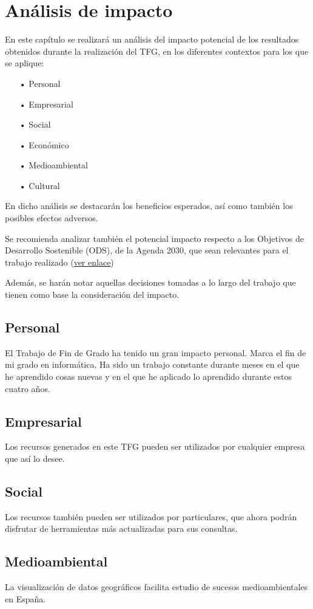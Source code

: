\chapter{Análisis de impacto}
En este capítulo se realizará un análisis del impacto potencial de los resultados obtenidos durante la realización del TFG, en los diferentes contextos para los que se aplique:

\begin{enumerate}
\item[•] Personal
\item[•] Empresarial
\item[•] Social
\item[•] Económico
\item[•] Medioambiental
\item[•] Cultural
\end{enumerate}

En dicho análisis se destacarán los beneficios esperados, así como también los posibles efectos adversos.

Se recomienda analizar también el potencial impacto respecto a los Objetivos de Desarrollo Sostenible (ODS), de la Agenda 2030, que sean relevantes para el trabajo realizado (\href{https://www.un.org/sustainabledevelopment/es/objetivos-de-desarrollo-sostenible/}{ver enlace})

Además, se harán notar aquellas decisiones tomadas a lo largo del trabajo que tienen como base la consideración del impacto.

\section{Personal}
El Trabajo de Fin de Grado ha tenido un gran impacto personal. Marca el fin de mi grado en informática. Ha sido
un trabajo constante durante meses en el que he aprendido cosas nuevas y en el que he aplicado lo aprendido
durante estos cuatro años.

\section{Empresarial}
Los recursos generados en este TFG pueden ser utilizados por cualquier empresa que así lo desee.

\section{Social}
Los recursos también pueden ser utilizados por particulares, que ahora podrán disfrutar de herramientas más
actualizadas para sus consultas.

\section{Medioambiental}
La visualización de datos geográficos facilita estudio de sucesos medioambientales en España.
